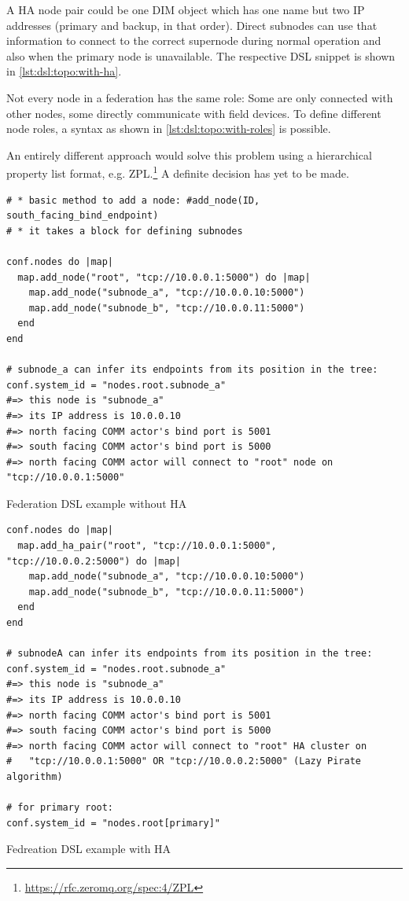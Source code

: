 A HA node pair could be one DIM object which has one name but two IP addresses
(primary and backup, in that order). Direct subnodes can use that information
to connect to the correct supernode during normal operation and also
when the primary node is unavailable. The respective DSL snippet is shown in
\autoref{lst:dsl:topo:with-ha}.

Not every node in a federation has the same role: Some are only connected with other
nodes, some directly communicate with field devices. To define different node roles, a
syntax as shown in \autoref{lst:dsl:topo:with-roles} is possible.

An entirely different approach would solve this problem using a hierarchical
property list format, e.g. ZPL.\footnote{\url{https://rfc.zeromq.org/spec:4/ZPL}}
A definite decision has yet to be made.

\begin{listing}
	\begin{verbatim}
# * basic method to add a node: #add_node(ID, south_facing_bind_endpoint)
# * it takes a block for defining subnodes

conf.nodes do |map|
  map.add_node("root", "tcp://10.0.0.1:5000") do |map|
    map.add_node("subnode_a", "tcp://10.0.0.10:5000")
    map.add_node("subnode_b", "tcp://10.0.0.11:5000")
  end
end

# subnode_a can infer its endpoints from its position in the tree:
conf.system_id = "nodes.root.subnode_a"
#=> this node is "subnode_a"
#=> its IP address is 10.0.0.10
#=> north facing COMM actor's bind port is 5001
#=> south facing COMM actor's bind port is 5000
#=> north facing COMM actor will connect to "root" node on "tcp://10.0.0.1:5000"
	\end{verbatim}
	\caption{Federation DSL example without HA}
	\label{lst:dsl:topo:no-ha}
\end{listing}

\begin{listing}
	\begin{verbatim}
conf.nodes do |map|
  map.add_ha_pair("root", "tcp://10.0.0.1:5000", "tcp://10.0.0.2:5000") do |map|
    map.add_node("subnode_a", "tcp://10.0.0.10:5000")
    map.add_node("subnode_b", "tcp://10.0.0.11:5000")
  end
end

# subnodeA can infer its endpoints from its position in the tree:
conf.system_id = "nodes.root.subnode_a"
#=> this node is "subnode_a"
#=> its IP address is 10.0.0.10
#=> north facing COMM actor's bind port is 5001
#=> south facing COMM actor's bind port is 5000
#=> north facing COMM actor will connect to "root" HA cluster on
#   "tcp://10.0.0.1:5000" OR "tcp://10.0.0.2:5000" (Lazy Pirate algorithm)

# for primary root:
conf.system_id = "nodes.root[primary]"
	\end{verbatim}
	\caption{Fedreation DSL example with HA}
	\label{lst:dsl:topo:with-ha}
\end{listing}

